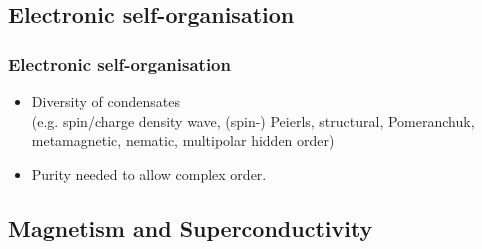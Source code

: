 \subsection{Electronic self-organisation}
\begin{frame}[label=ElecStates]
\frametitle{Electronic self-organisation}

\centerline{}
\vspace{2ex}

\begin{itemize}
\item<visible@5-> Diversity of condensates\\ {\small (e.g. spin/charge
density wave, (spin-) Peierls, structural,
Pomeranchuk, metamagnetic, nematic, multipolar 
hidden order)}


\item<visible@6-> Purity needed to allow complex order.
\end{itemize}

\end{frame}






\subsection{Magnetism and Superconductivity}

